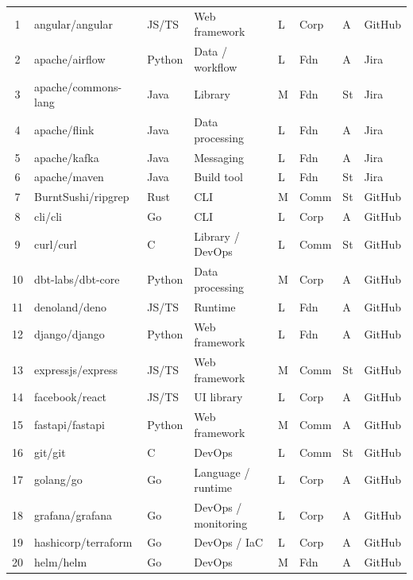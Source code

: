 \begin{landscape}
\begin{longtable}{clllllll}
 1  & angular/angular              & JS/TS  & Web framework      & L & Corp & A  & GitHub \\
 2  & apache/airflow               & Python & Data / workflow    & L & Fdn  & A  & Jira \\
 3  & apache/commons-lang          & Java   & Library            & M & Fdn  & St & Jira \\
 4  & apache/flink                 & Java   & Data processing    & L & Fdn  & A  & Jira \\
 5  & apache/kafka                 & Java   & Messaging          & L & Fdn  & A  & Jira \\
 6  & apache/maven                 & Java   & Build tool         & L & Fdn  & St & Jira \\
 7  & BurntSushi/ripgrep           & Rust   & CLI                & M & Comm & St & GitHub \\
 8  & cli/cli                      & Go     & CLI                & L & Corp & A  & GitHub \\
 9  & curl/curl                    & C      & Library / DevOps   & L & Comm & St & GitHub \\
10  & dbt-labs/dbt-core            & Python & Data processing    & M & Corp & A  & GitHub \\
11  & denoland/deno                & JS/TS  & Runtime            & L & Fdn  & A  & GitHub \\
12  & django/django                & Python & Web framework      & L & Fdn  & A  & GitHub \\
13  & expressjs/express            & JS/TS  & Web framework      & M & Comm & St & GitHub \\
14  & facebook/react               & JS/TS  & UI library         & L & Corp & A  & GitHub \\
15  & fastapi/fastapi              & Python & Web framework      & M & Comm & A  & GitHub \\
16  & git/git                      & C      & DevOps             & L & Comm & St & GitHub \\
17  & golang/go                    & Go     & Language / runtime & L & Corp & A  & GitHub \\
18  & grafana/grafana              & Go     & DevOps / monitoring& L & Corp & A  & GitHub \\
19  & hashicorp/terraform          & Go     & DevOps / IaC       & L & Corp & A  & GitHub \\
20  & helm/helm                    & Go     & DevOps             & M & Fdn  & A  & GitHub \\

\end{longtable}
\end{landscape}
